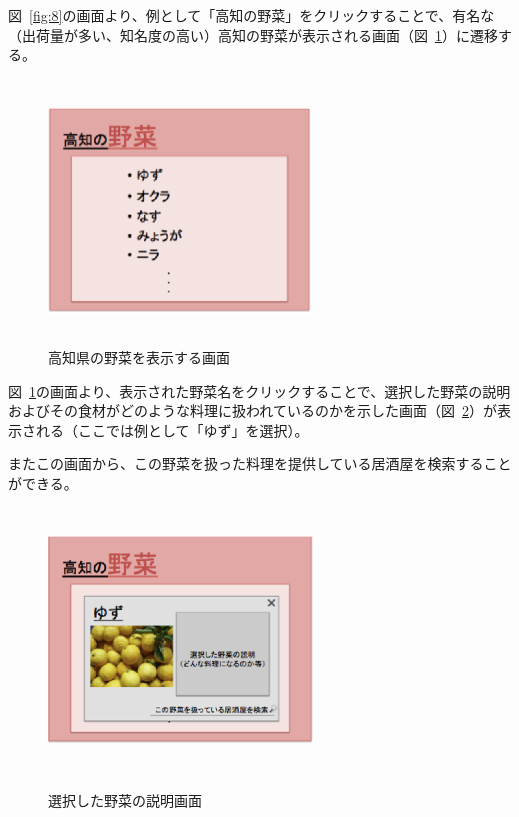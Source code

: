 図~\ref{fig:8}の画面より、例として「高知の野菜」をクリックすることで、有名な（出荷量が多い、知名度の高い）高知の野菜が表示される画面（図~\ref{fig:9}）に遷移する。
\clearpage
\begin {figure}[!htbp]
    \begin{center}
    \includegraphics [height=7cm, width=7cm]{9.eps}
    \caption {高知県の野菜を表示する画面}
    \label {fig:9}
    \end{center}
\end {figure}



図~\ref{fig:9}の画面より、表示された野菜名をクリックすることで、選択した野菜の説明およびその食材がどのような料理に扱われているのかを示した画面（図~\ref{fig:10}）が表示される（ここでは例として「ゆず」を選択）。



またこの画面から、この野菜を扱った料理を提供している居酒屋を検索することができる。



\begin {figure}[!htbp]
    \begin{center}
    \includegraphics [height=7cm, width=7cm]{10.eps}
　　    \caption {選択した野菜の説明画面}
    \label {fig:10}
    \end{center}
\end {figure}



